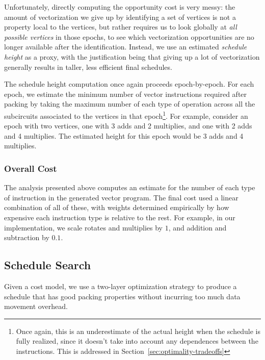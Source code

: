 Unfortunately, directly computing the opportunity cost is very messy: the amount of vectorization we give up by identifying a set of vertices is not a property local to the vertices, but rather requires us to look globally at {\em all possible vertices} in those epochs, to see which vectorization opportunities are no longer available after the identification.
Instead, we use an estimated {\em schedule height} as a proxy, with the justification being that giving up a lot of vectorization generally results in taller, less efficient final schedules. 

The schedule height computation once again proceeds epoch-by-epoch.
For each epoch, we estimate the minimum number of vector instructions required after packing by taking the maximum number of each type of operation across all the subcircuits associated to the vertices in that epoch\footnote{Once again, this is an underestimate of the actual height when the schedule is fully realized, since it doesn't take into account any dependences between the instructions. This is addressed in Section~\ref{sec:optimality-tradeoffs}}.
For example, consider an epoch with two vertices, one with 3 adds and 2 multiplies, and one with 2 adds and 4 multiplies.
The estimated height for this epoch would be 3 adds and 4 multiplies.

\subsubsection*{Overall Cost}
The analysis presented above computes an estimate for the number of each type of instruction in the generated vector program.
The final cost used a linear combination of all of these, with weights determined empirically by how expensive each instruction type is relative to the rest.
For example, in our implementation, we scale rotates and multiplies by $1$, and addition and subtraction by $0.1$. 

\subsection{Schedule Search}\label{sec:schedule-search}
Given a cost model, we use a two-layer optimization strategy to produce a schedule that has good packing properties without incurring too much data movement overhead.

